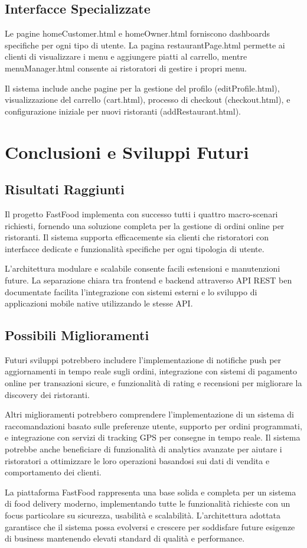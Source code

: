 \documentclass[12pt,a4paper]{article}
\begin{document}
\subsection{Interfacce Specializzate}

Le pagine homeCustomer.html e homeOwner.html forniscono dashboards specifiche per ogni tipo di utente. La pagina restaurantPage.html permette ai clienti di visualizzare i menu e aggiungere piatti al carrello, mentre menuManager.html consente ai ristoratori di gestire i propri menu.

Il sistema include anche pagine per la gestione del profilo (editProfile.html), visualizzazione del carrello (cart.html), processo di checkout (checkout.html), e configurazione iniziale per nuovi ristoranti (addRestaurant.html).

\section{Conclusioni e Sviluppi Futuri}

\subsection{Risultati Raggiunti}

Il progetto FastFood implementa con successo tutti i quattro macro-scenari richiesti, fornendo una soluzione completa per la gestione di ordini online per ristoranti. Il sistema supporta efficacemente sia clienti che ristoratori con interfacce dedicate e funzionalità specifiche per ogni tipologia di utente.

L'architettura modulare e scalabile consente facili estensioni e manutenzioni future. La separazione chiara tra frontend e backend attraverso API REST ben documentate facilita l'integrazione con sistemi esterni e lo sviluppo di applicazioni mobile native utilizzando le stesse API.

\subsection{Possibili Miglioramenti}

Futuri sviluppi potrebbero includere l'implementazione di notifiche push per aggiornamenti in tempo reale sugli ordini, integrazione con sistemi di pagamento online per transazioni sicure, e funzionalità di rating e recensioni per migliorare la discovery dei ristoranti.

Altri miglioramenti potrebbero comprendere l'implementazione di un sistema di raccomandazioni basato sulle preferenze utente, supporto per ordini programmati, e integrazione con servizi di tracking GPS per consegne in tempo reale. Il sistema potrebbe anche beneficiare di funzionalità di analytics avanzate per aiutare i ristoratori a ottimizzare le loro operazioni basandosi sui dati di vendita e comportamento dei clienti.

La piattaforma FastFood rappresenta una base solida e completa per un sistema di food delivery moderno, implementando tutte le funzionalità richieste con un focus particolare su sicurezza, usabilità e scalabilità. L'architettura adottata garantisce che il sistema possa evolversi e crescere per soddisfare future esigenze di business mantenendo elevati standard di qualità e performance.
\end{document}

